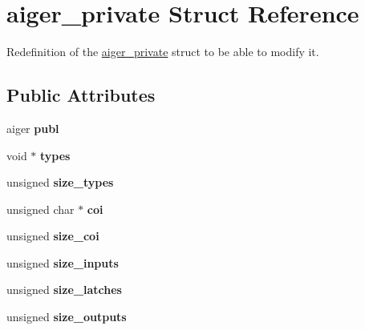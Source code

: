 \hypertarget{structaiger__private}{\section{aiger\-\_\-private Struct Reference}
\label{structaiger__private}
}


Redefinition of the \hyperlink{structaiger__private}{aiger\-\_\-private} struct to be able to modify it.  


\subsection*{Public Attributes}
\begin{DoxyCompactItemize}
\item 
\hypertarget{structaiger__private_a62e0f340ce936099c0f3c2e8462eace6}{aiger {\bfseries publ}}\label{structaiger__private_a62e0f340ce936099c0f3c2e8462eace6}

\item 
\hypertarget{structaiger__private_aa5f1b5a8f1f56b66960e009c3a063765}{void $\ast$ {\bfseries types}}\label{structaiger__private_aa5f1b5a8f1f56b66960e009c3a063765}

\item 
\hypertarget{structaiger__private_ab28d3db4875f4253a8f4158a2e03d985}{unsigned {\bfseries size\-\_\-types}}\label{structaiger__private_ab28d3db4875f4253a8f4158a2e03d985}

\item 
\hypertarget{structaiger__private_af19494cd11aacd23960d494ece08b6a3}{unsigned char $\ast$ {\bfseries coi}}\label{structaiger__private_af19494cd11aacd23960d494ece08b6a3}

\item 
\hypertarget{structaiger__private_a174795cdd5c58e0cfcff8b54c0238dc3}{unsigned {\bfseries size\-\_\-coi}}\label{structaiger__private_a174795cdd5c58e0cfcff8b54c0238dc3}

\item 
\hypertarget{structaiger__private_a4c79579261f151eee561bacec9180f56}{unsigned {\bfseries size\-\_\-inputs}}\label{structaiger__private_a4c79579261f151eee561bacec9180f56}

\item 
\hypertarget{structaiger__private_aa269fc64c96f64d6c94ecfe1e8a1c30b}{unsigned {\bfseries size\-\_\-latches}}\label{structaiger__private_aa269fc64c96f64d6c94ecfe1e8a1c30b}

\item 
\hypertarget{structaiger__private_a88b69bd32c25c71cf36cd07bbf31407d}{unsigned {\bfseries size\-\_\-outputs}}\label{structaiger__private_a88b69bd32c25c71cf36cd07bbf31407d}


\end{DoxyCompactItemize}

